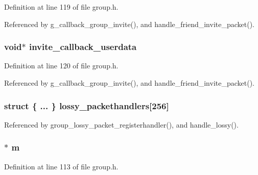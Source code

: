Definition at line 119 of file group.\+h.



Referenced by g\+\_\+callback\+\_\+group\+\_\+invite(), and handle\+\_\+friend\+\_\+invite\+\_\+packet().

\hypertarget{struct_group___chats_a4a640f20c34159b06875274fedf9dc69}{
\subsubsection[{invite\+\_\+callback\+\_\+userdata}]{\setlength{\rightskip}{0pt plus 5cm}void$\ast$ invite\+\_\+callback\+\_\+userdata}}\label{struct_group___chats_a4a640f20c34159b06875274fedf9dc69}


Definition at line 120 of file group.\+h.



Referenced by g\+\_\+callback\+\_\+group\+\_\+invite(), and handle\+\_\+friend\+\_\+invite\+\_\+packet().

\hypertarget{struct_group___chats_a3630aa7993bdd216d40637826a92649f}{
\subsubsection[{lossy\+\_\+packethandlers}]{\setlength{\rightskip}{0pt plus 5cm}struct \{ ... \}   lossy\+\_\+packethandlers\mbox{[}256\mbox{]}}}\label{struct_group___chats_a3630aa7993bdd216d40637826a92649f}


Referenced by group\+\_\+lossy\+\_\+packet\+\_\+registerhandler(), and handle\+\_\+lossy().

\hypertarget{struct_group___chats_aea6eb6c7c30a659f1b0dee83eaf03ea2}{
\subsubsection[{m}]{$\ast$ m}}\label{struct_group___chats_aea6eb6c7c30a659f1b0dee83eaf03ea2}


Definition at line 113 of file group.\+h.




